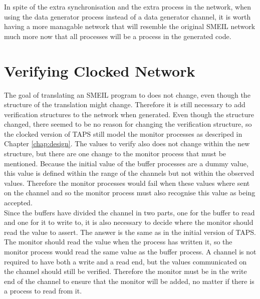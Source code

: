 In spite of the extra synchronisation and the extra process in the network, when using the data generator process instead of a data generator channel, it is worth having a more managable network that will resemble the original SMEIL network much more now that all processes will be a process in the generated \cspm{} code.

\section{Verifying Clocked Network}
The goal of translating an SMEIL program to \cspm{} does not change, even though the structure of the translation might change. Therefore it is still necessary to add verification structures to the \cspm{} network when generated. Even though the structure changed, there seemed to be no reason for changing the verification structure, so the clocked version of TAPS still model the monitor processes as descriped in Chapter \ref{chap:design}. The values to verify also does not change within the new structure, but there are one change to the monitor process that must be mentioned. Because the initial value of the buffer processes are a dummy value, this value is defined within the range of the channels but not within the observed values. Therefore the monitor processes would fail when these values where sent on the channel and so the monitor process must also recognise this value as being accepted. \\

Since the buffers have divided the channel in two parts, one for the buffer to read and one for it to write to, it is also necessary to decide where the monitor should read the value to assert. The answer is the same as in the initial version of TAPS. The monitor should read the value when the process has written it, so the monitor process would read the same value as the buffer process. A channel is not required to have both a write and a read end, but the values communicated on the channel should still be verified. Therefore the monitor must be in the write end of the channel to ensure that the monitor will be added, no matter if there is a process to read from it. \\

